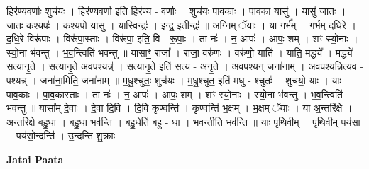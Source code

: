 \documentclass[17pt]{extarticle}
\begin{document}
हिर॑ण्यवर्णाः॒ शुच॑यः । हिर॑ण्यवर्णा॒ इति॒ हिर॑ण्य - व॒र्णाः॒ । शुच॑यः पाव॒काः । पा॒व॒का यासु॑ । यासु॑ जा॒तः । जा॒तः क॒श्यपः॑ । क॒श्यपो॒ यासु॑ । यास्विन्द्रः॑ । इन्द्र॒ इतीन्द्रः॑ ॥ अ॒ग्निम् ॅयाः । या गर्भ᳚म् । गर्भ॑म् दधि॒रे । द॒धि॒रे विरू॑पाः । विरू॑पा॒स्ताः । विरू॑पा॒ इति॒ वि - रू॒पाः॒ । ता नः॑ । न॒ आपः॑ । आपः॒ शम् । शꣳ स्यो॒नाः । स्यो॒ना भ॑वन्तु । भ॒व॒न्त्विति॑ भवन्तु ॥ यासाꣳ॒॒ राजा᳚ । राजा॒ वरु॑णः । वरु॑णो॒ याति॑ । याति॒ मद्ध्ये᳚ । मद्ध्ये॑ सत्यानृ॒ते । स॒त्या॒नृ॒ते अ॑व॒पश्यन्न्॑ । स॒त्या॒नृ॒ते इति॑ सत्य - अ॒नृ॒ते । अ॒व॒पश्य॒न् जना॑नाम् । अ॒व॒पश्य॒न्नित्य॑व - पश्यन्न्॑ । जना॑ना॒मिति॒ जना॑नाम् ॥ म॒धु॒श्चुतः॒ शुच॑यः । म॒धु॒श्चुत॒ इति॑ मधु - श्चुतः॑ । शुच॑यो॒ याः । याः पा॑व॒काः । पा॒व॒कास्ताः । ता नः॑ । न॒ आपः॑ । आपः॒ शम् । शꣳ स्यो॒नाः । स्यो॒ना भ॑वन्तु । भ॒व॒न्त्विति॑ भवन्तु ॥ यासा᳚म् दे॒वाः । दे॒वा दि॒वि । दि॒वि कृ॒ण्वन्ति॑ । कृ॒ण्वन्ति॑ भ॒क्षम् । भ॒क्षम् ॅयाः । या अ॒न्तरि॑क्षे । अ॒न्तरि॑क्षे बहु॒धा । ब॒हु॒धा भव॑न्ति । ब॒हु॒धेति॑ बहु - धा । भव॒न्तीति॒ भव॑न्ति ॥ याः पृ॑थि॒वीम् । पृ॒थि॒वीम् पय॑सा । पय॑सो॒न्दन्ति॑ । उ॒न्दन्ति॑ शु॒क्राः \newline

\textbf{Jatai Paata} \newline
\end{document}
